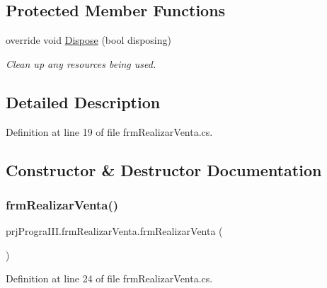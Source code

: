 \subsection*{Protected Member Functions}
\begin{DoxyCompactItemize}
\item 
override void \hyperlink{classprj_progra_i_i_i_1_1frm_realizar_venta_a0d7ee36310182016d15cf55016db9468}{Dispose} (bool disposing)
\begin{DoxyCompactList}\small\item\em Clean up any resources being used. \end{DoxyCompactList}\end{DoxyCompactItemize}


\subsection{Detailed Description}


Definition at line 19 of file frm\+Realizar\+Venta.\+cs.



\subsection{Constructor \& Destructor Documentation}
\hypertarget{classprj_progra_i_i_i_1_1frm_realizar_venta_ad5950906776440d5a1b3a57fe4eba5a0}{}\label{classprj_progra_i_i_i_1_1frm_realizar_venta_ad5950906776440d5a1b3a57fe4eba5a0} 
\subsubsection{\texorpdfstring{frm\+Realizar\+Venta()}{frmRealizarVenta()}}
{\footnotesize\ttfamily prj\+Progra\+I\+I\+I.\+frm\+Realizar\+Venta.\+frm\+Realizar\+Venta (\begin{DoxyParamCaption}{ }\end{DoxyParamCaption})}



Definition at line 24 of file frm\+Realizar\+Venta.\+cs.

